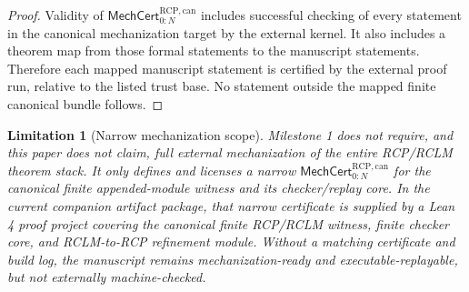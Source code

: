 \documentclass[11pt]{article}
\newtheorem{limitation}[theorem]{Limitation}
\newcommand{\1}{\mathbf{1}}
\newcommand{\RCP}{\mathrm{RCP}}
\begin{document}
\begin{proof}
Validity of \(\mathsf{MechCert}_{0:N}^{\RCP,\mathrm{can}}\) includes successful checking of every statement in the canonical mechanization target by the external kernel.  It also includes a theorem map from those formal statements to the manuscript statements.  Therefore each mapped manuscript statement is certified by the external proof run, relative to the listed trust base.  No statement outside the mapped finite canonical bundle follows.
\end{proof}

\begin{limitation}[Narrow mechanization scope]
\label{lim:batch13rb_narrow_mechanization_scope}
Milestone 1 does not require, and this paper does not claim, full external mechanization of the entire RCP/RCLM theorem stack.  It only defines and licenses a narrow \(\mathsf{MechCert}_{0:N}^{\RCP,\mathrm{can}}\) for the canonical finite appended-module witness and its checker/replay core.  In the current companion artifact package, that narrow certificate is supplied by a Lean 4 proof project covering the canonical finite RCP/RCLM witness, finite checker core, and RCLM-to-RCP refinement module.  Without a matching certificate and build log, the manuscript remains mechanization-ready and executable-replayable, but not externally machine-checked.
\end{limitation}
\end{document}
